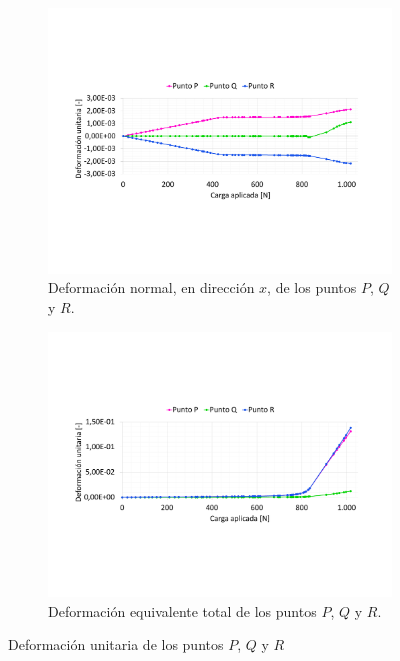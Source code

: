 \begin{figure}[p]
\centering
	\begin{subfigure}{1\linewidth}
		\centering
		\includegraphics[width=\linewidth, trim={2cm 5cm 2cm 5cm},clip]{Imagenes/defpqr_normal.pdf}
		\caption{Deformación normal, en dirección $x$, de los puntos $P$, $Q$ y $R$.}
		\label{fig:defpqr_normal}
	\end{subfigure}
		\begin{subfigure}{1\linewidth}
		\centering
		\includegraphics[width=\linewidth, trim={2cm 5cm 2cm 5cm},clip]{Imagenes/defpqr_vmt.pdf}
		\caption{Deformación equivalente total de los puntos $P$, $Q$ y $R$.}
		\label{fig:defpqr_vmt}
	\end{subfigure}
\caption{Deformación unitaria de los puntos $P$, $Q$ y $R$  }
\label{fig:def_pqr}
\end{figure}

